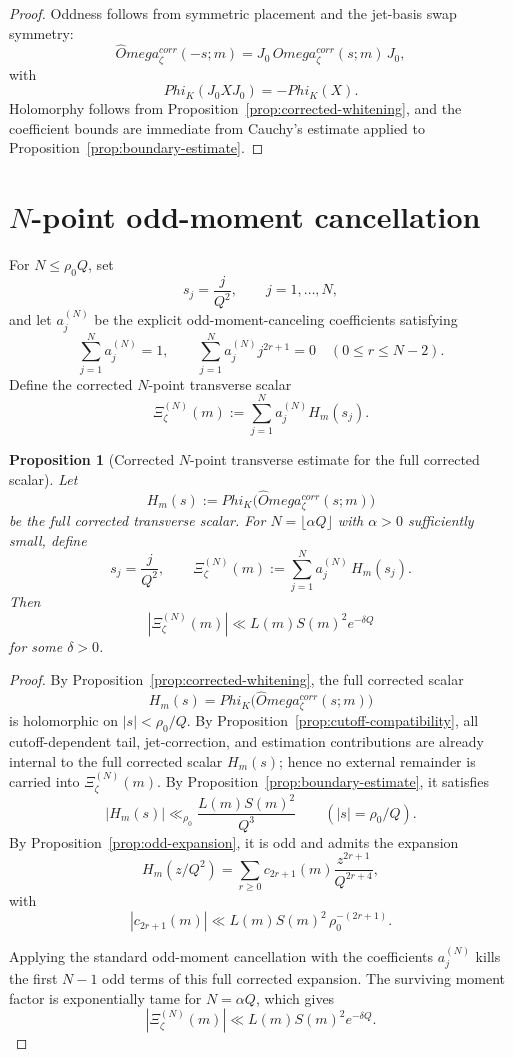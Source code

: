 \documentclass[11pt,a4paper]{amsart}
\def\Omega{Omega}%
\def\Phi{Phi}%
\def\corr{corr}%
\theoremstyle{plain}
\newtheorem{proposition}[theorem]{Proposition}
\theoremstyle{definition}
\newcommand{\corr}{\mathrm{corr}}
\begin{document}
\begin{proof}
Oddness follows from symmetric placement and the jet-basis swap symmetry:
\[
\widehat\Omega_\zeta^{\corr}(-s;m)=J_0\,\widehat\Omega_\zeta^{\corr}(s;m)\,J_0,
\]
with
\[
\Phi_K(J_0XJ_0)=-\Phi_K(X).
\]
Holomorphy follows from Proposition~\ref{prop:corrected-whitening}, and the
coefficient bounds are immediate from Cauchy's estimate applied to
Proposition~\ref{prop:boundary-estimate}.
\end{proof}

\section{\texorpdfstring{$N$}{N}-point odd-moment cancellation}

For $N\le \rho_0Q$, set
\[
s_j=\frac{j}{Q^2},
\qquad j=1,\dots,N,
\]
and let $a_j^{(N)}$ be the explicit odd-moment-canceling coefficients satisfying
\[
\sum_{j=1}^N a_j^{(N)}=1,
\qquad
\sum_{j=1}^N a_j^{(N)}j^{2r+1}=0
\quad (0\le r\le N-2).
\]
Define the corrected $N$-point transverse scalar
\begin{equation}\label{eq:Xi-zeta}
\Xi_\zeta^{(N)}(m):=
\sum_{j=1}^N a_j^{(N)}H_m(s_j).
\end{equation}

\begin{proposition}[Corrected $N$-point transverse estimate for the full corrected scalar]
\label{prop:corrected-n-point}
Let
\[
H_m(s):=\Phi_K\!\bigl(\widehat\Omega_\zeta^{\corr}(s;m)\bigr)
\]
be the full corrected transverse scalar.
For $N=\lfloor \alpha Q\rfloor$ with $\alpha>0$ sufficiently small,
define
\[
s_j=\frac{j}{Q^2},
\qquad
\Xi_\zeta^{(N)}(m)
:=
\sum_{j=1}^N a_j^{(N)}\,H_m(s_j).
\]
Then
\[
|\Xi_\zeta^{(N)}(m)|\ll L(m)S(m)^2e^{-\delta Q}
\]
for some $\delta>0$.
\end{proposition}

\begin{proof}
By Proposition~\ref{prop:corrected-whitening}, the full corrected scalar
\[
H_m(s)=\Phi_K\!\bigl(\widehat\Omega_\zeta^{\corr}(s;m)\bigr)
\]
is holomorphic on $|s|<\rho_0/Q$. By
Proposition~\ref{prop:cutoff-compatibility}, all cutoff-dependent tail,
jet-correction, and estimation contributions are already internal to the full
corrected scalar $H_m(s)$; hence no external remainder is carried into
$\Xi_\zeta^{(N)}(m)$. By Proposition~\ref{prop:boundary-estimate},
it satisfies
\[
|H_m(s)|\ll_{\rho_0}\frac{L(m)S(m)^2}{Q^3}
\qquad (|s|=\rho_0/Q).
\]
By Proposition~\ref{prop:odd-expansion}, it is odd and admits the expansion
\[
H_m(z/Q^2)
=
\sum_{r\ge 0} c_{2r+1}(m)\frac{z^{2r+1}}{Q^{2r+4}},
\]
with
\[
|c_{2r+1}(m)|\ll L(m)S(m)^2\,\rho_0^{-(2r+1)}.
\]

Applying the standard odd-moment cancellation with the coefficients
$a_j^{(N)}$ kills the first $N-1$ odd terms of this full corrected
expansion. The surviving moment factor is exponentially tame for
$N=\alpha Q$, which gives
\[
|\Xi_\zeta^{(N)}(m)|\ll L(m)S(m)^2e^{-\delta Q}.
\]
\end{proof}
\end{document}
